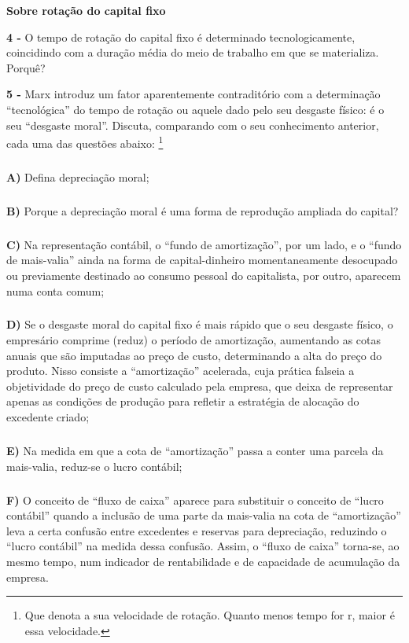 \documentclass[a4paper, 12pt]{article} %
\begin{document}
\vspace{0.5cm}

\begin{center}
\textbf{Sobre rotação do capital fixo}
\end{center}

\vspace{0.5cm}

\par \textbf{4 - } O tempo de rotação do capital fixo é determinado tecnologicamente, coincidindo com a duração
média do meio de trabalho em que se materializa. Porquê?

\vspace{0.5cm}

\par \textbf{5 - } Marx introduz um fator aparentemente contraditório com a determinação “tecnológica” do tempo de
rotação ou aquele dado pelo seu desgaste físico: é o seu “desgaste moral”. Discuta, comparando com o
seu conhecimento anterior, cada uma das questões abaixo: \footnote{Que denota a sua velocidade de rotação. Quanto menos tempo for r, maior é essa velocidade.}

\subparagraph{} \textbf{A)} Defina depreciação moral;

\subparagraph{} \textbf{B)} Porque a depreciação moral é uma forma de reprodução ampliada do capital?

\subparagraph{} \textbf{C)} Na representação contábil, o “fundo de amortização”, por um lado, e o “fundo de mais-valia”
ainda na forma de capital-dinheiro momentaneamente desocupado ou previamente destinado
ao consumo pessoal do capitalista, por outro, aparecem numa conta comum;



\subparagraph{} \textbf{D)} Se o desgaste moral do capital fixo é mais rápido que o seu desgaste físico, o empresário
comprime (reduz) o período de amortização, aumentando as cotas anuais que são imputadas
ao preço de custo, determinando a alta do preço do produto. Nisso consiste a “amortização”
acelerada, cuja prática falseia a objetividade do preço de custo calculado pela empresa, que deixa de representar apenas as condições de produção para refletir a estratégia de alocação do
excedente criado;

\subparagraph{} \textbf{E)} Na medida em que a cota de “amortização” passa a conter uma parcela da mais-valia, reduz-se
o lucro contábil;

\subparagraph{} \textbf{F)} O conceito de “fluxo de caixa” aparece para substituir o conceito de “lucro contábil” quando a
inclusão de uma parte da mais-valia na cota de “amortização” leva a certa confusão entre
excedentes e reservas para depreciação, reduzindo o “lucro contábil” na medida dessa
confusão. Assim, o “fluxo de caixa” torna-se, ao mesmo tempo, num indicador de rentabilidade
e de capacidade de acumulação da empresa.
\end{document}
